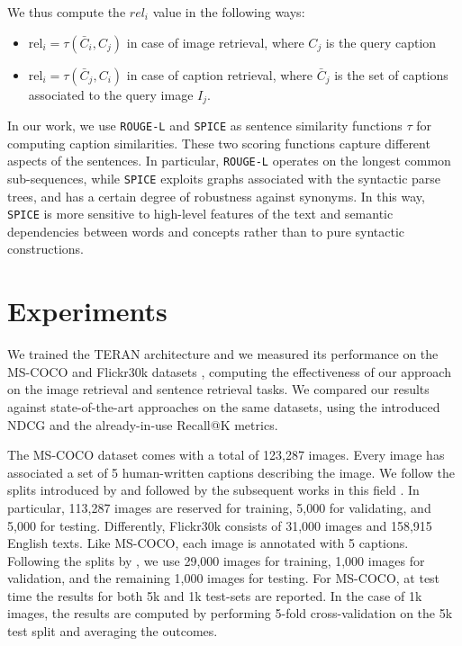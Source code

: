 \documentclass[acmsmall]{acmart}
\begin{document}
We thus compute the $rel_i$ value in the following ways:
\begin{itemize}
    \item $\text{rel}_i = \tau(\bar{C}_i, C_j)$ in case of image retrieval, where $C_j$ is the query caption
    \item $\text{rel}_i = \tau(\bar{C}_j, C_i)$ in case of caption retrieval, where $\bar{C}_j$ is the set of captions associated to the query image $I_j$. 
\end{itemize}

In our work, we use \texttt{ROUGE-L}\cite{lin-2004-rouge} and \texttt{SPICE}\cite{AndersonFJG16spice} as sentence similarity functions $\tau$ for computing caption similarities. These two scoring functions capture different aspects of the sentences. In particular, \texttt{ROUGE-L} operates on the longest common sub-sequences, while \texttt{SPICE} exploits graphs associated with the syntactic parse trees, and has a certain degree of robustness against synonyms. In this way, \texttt{SPICE} is more sensitive to high-level features of the text and semantic dependencies between words and concepts rather than to pure syntactic constructions.


\section{Experiments}
\label{sec:experiments}
We trained the TERAN architecture and we measured its performance on the MS-COCO \cite{LinMBHPRDZ14coco} and Flickr30k datasets \cite{young2014image}, computing the effectiveness of our approach on the image retrieval and sentence retrieval tasks. We compared our results against state-of-the-art approaches on the same datasets, using the introduced NDCG and the already-in-use Recall@K metrics.

The MS-COCO dataset comes with a total of 123,287 images. Every image has associated a set of 5 human-written captions describing the image. 
We follow the splits introduced by \cite{karpathy2015alignment} and followed by the subsequent works in this field \cite{vsepp2018faghri,GuCJN018,li2019}. In particular, 113,287 images are reserved for training, 5,000 for validating, and 5,000 for testing.
Differently, Flickr30k consists of 31,000 images and 158,915 English texts. Like MS-COCO, each image is annotated with 5 captions. Following the splits by \cite{karpathy2015alignment}, we use 29,000 images for training, 1,000 images for validation, and the remaining 1,000 images for testing.
For MS-COCO, at test time the results for both 5k and 1k test-sets are reported. In the case of 1k images, the results are computed by performing 5-fold cross-validation on the 5k test split and averaging the outcomes.
\end{document}
